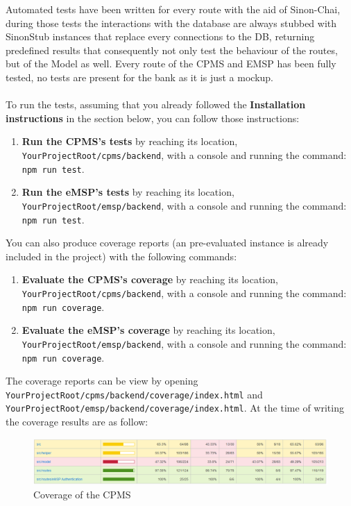 \documentclass[11pt]{article}
\newcommand{\code}[1]{\colorbox{light-gray}{\texttt{#1}}}
\def\code#1{{\texttt{#1}}}
\begin{document}
Automated tests have been written for every route with the aid of Sinon-Chai, during those tests the interactions with the database are always stubbed with SinonStub instances that replace every connections to the DB, returning predefined results that consequently not only test the behaviour of the routes, but of the Model as well.
Every route of the CPMS and EMSP has been fully tested, no tests are present for the bank as it is just a mockup. \\
\\
To run the tests, assuming that you already followed the \textbf{Installation instructions} in the section below, you can follow those instructions:
\begin{enumerate}
    \item \textbf{Run the CPMS's tests} by reaching its location, \code{YourProjectRoot/cpms/backend}, with a console and running the command: \code{npm run test}.
    \item \textbf{Run the eMSP's tests} by reaching its location, \code{YourProjectRoot/emsp/backend}, with a console and running the command: \code{npm run test}.
\end{enumerate}
You can also produce coverage reports (an pre-evaluated instance is already included in the project) with the following commands:
\begin{enumerate}
    \item \textbf{Evaluate the CPMS's coverage} by reaching its location, \code{YourProjectRoot/cpms/backend}, with a console and running the command: \code{npm run coverage}.
    \item \textbf{Evaluate the eMSP's coverage} by reaching its location, \code{YourProjectRoot/emsp/backend}, with a console and running the command: \code{npm run coverage}.
\end{enumerate}
The coverage reports can be view by opening \code{YourProjectRoot/cpms/backend/coverage/index.html} and \code{YourProjectRoot/emsp/backend/coverage/index.html}.
At the time of writing the coverage results are as follow:

\begin{figure}[!ht]
    \centering
    \includegraphics[width=160mm]{CPMSCoverage.PNG}
    \captionsetup{justification=centering,margin=2cm}
    \caption{Coverage of the CPMS}
    \label{fig:my_label}
\end{figure}
\end{document}
